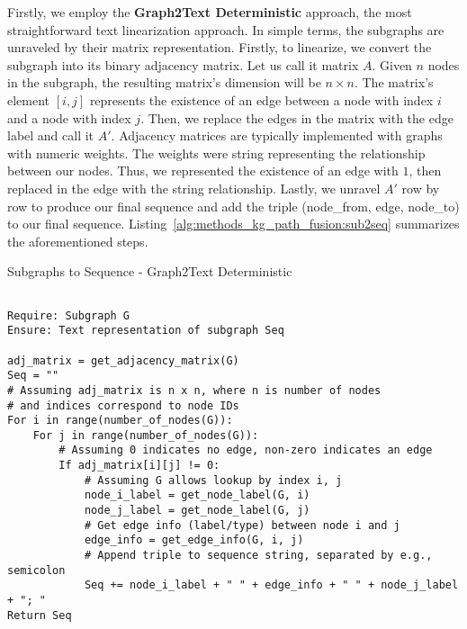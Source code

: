 Firstly, we employ the \textbf{Graph2Text Deterministic} approach, the most straightforward text linearization approach. In simple terms, the subgraphs are unraveled by their matrix representation. Firstly, to linearize, we convert the subgraph into its binary adjacency matrix. Let us call it matrix $A$. 
Given $n$ nodes in the subgraph, the resulting matrix's dimension will be $n \times n$. The matrix's element $[i, j]$ represents the existence of an edge between a node with index $i$ and a node with index $j$. Then, we replace the edges in the matrix with the edge label and call it $A'$. 
Adjacency matrices are typically implemented with graphs with numeric weights. The weights were string representing the relationship between our nodes. Thus, we represented the existence of an edge with $1$, then replaced in the edge with the string relationship.
Lastly, we unravel $A'$ row by row to produce our final sequence and add the triple (node\_from, edge, node\_to) to our final sequence. Listing~\ref{alg:methods_kg_path_fusion:sub2seq} summarizes the aforementioned steps. 

\begin{ListingEnv}[p]
    \centering %
    \caption{Subgraphs to Sequence - Graph2Text Deterministic} 
    \label{alg:methods_kg_path_fusion:sub2seq} 
    \begin{lstlisting}[basicstyle=\fontsize{10pt}{12pt}\selectfont\ttfamily] % Smaller font for code

Require: Subgraph G
Ensure: Text representation of subgraph Seq

adj_matrix = get_adjacency_matrix(G)
Seq = ""
# Assuming adj_matrix is n x n, where n is number of nodes
# and indices correspond to node IDs
For i in range(number_of_nodes(G)): 
    For j in range(number_of_nodes(G)):
        # Assuming 0 indicates no edge, non-zero indicates an edge
        If adj_matrix[i][j] != 0: 
            # Assuming G allows lookup by index i, j
            node_i_label = get_node_label(G, i) 
            node_j_label = get_node_label(G, j)
            # Get edge info (label/type) between node i and j
            edge_info = get_edge_info(G, i, j) 
            # Append triple to sequence string, separated by e.g., semicolon
            Seq += node_i_label + " " + edge_info + " " + node_j_label + "; " 
Return Seq
    \end{lstlisting}
\end{ListingEnv}

